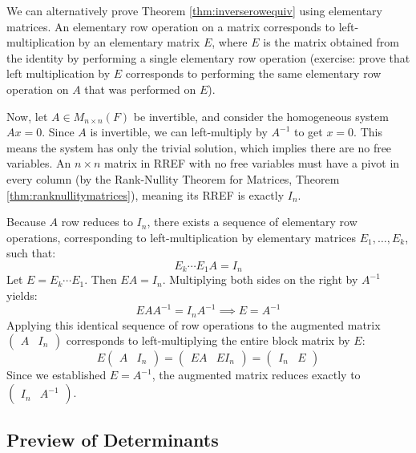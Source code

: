 \documentclass[../linear_algebra_and_groups.tex]{subfiles}
\begin{document}
\begin{remark}
    We can alternatively prove Theorem \ref{thm:inverserowequiv} using elementary matrices. An elementary row operation on a matrix corresponds to left-multiplication by an elementary matrix $E$, where $E$ is the matrix obtained from the identity by performing a single elementary row operation (exercise: prove that left multiplication by $E$ corresponds to performing the same elementary row operation on $A$ that was performed on $E$).\par
    Now, let $A\in M_{n\times n}(F)$ be invertible, and consider the homogeneous system $Ax = 0$. Since $A$ is invertible, we can left-multiply by $A^{-1}$ to get $x = 0$. This means the system has only the trivial solution, which implies there are no free variables. An $n \times n$ matrix in RREF with no free variables must have a pivot in every column (by the Rank-Nullity Theorem for Matrices, Theorem \ref{thm:ranknullitymatrices}), meaning its RREF is exactly $I_n$.
    
    Because $A$ row reduces to $I_n$, there exists a sequence of elementary row operations, corresponding to left-multiplication by elementary matrices $E_1, \dots, E_k$, such that:
    \[ E_k \cdots E_1 A = I_n \]
    Let $E = E_k \cdots E_1$. Then $EA = I_n$. Multiplying both sides on the right by $A^{-1}$ yields:
    \[ EAA^{-1} = I_n A^{-1} \implies E = A^{-1} \]
    Applying this identical sequence of row operations to the augmented matrix $\left(\begin{array}{c|c} A & I_n \end{array}\right)$ corresponds to left-multiplying the entire block matrix by $E$:
    \[ E\left(\begin{array}{c|c} A & I_n \end{array}\right) = \left(\begin{array}{c|c} EA & EI_n \end{array}\right) = \left(\begin{array}{c|c} I_n & E \end{array}\right) \]
    Since we established $E = A^{-1}$, the augmented matrix reduces exactly to $\left(\begin{array}{c|c} I_n & A^{-1} \end{array}\right)$.
\end{remark}

\subsection{Preview of Determinants}
\end{document}
